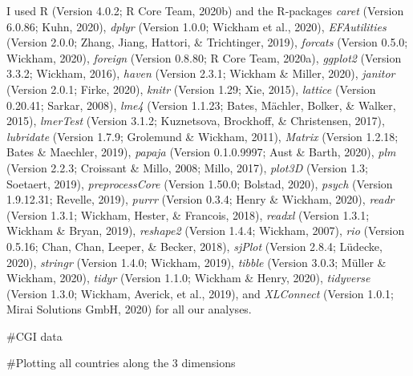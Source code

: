 \documentclass[
  english,
  man]{apa6}
\begin{document}
I used R (Version 4.0.2; R Core Team, 2020b) and the R-packages \emph{caret} (Version 6.0.86; Kuhn, 2020), \emph{dplyr} (Version 1.0.0; Wickham et al., 2020), \emph{EFAutilities} (Version 2.0.0; Zhang, Jiang, Hattori, \& Trichtinger, 2019), \emph{forcats} (Version 0.5.0; Wickham, 2020), \emph{foreign} (Version 0.8.80; R Core Team, 2020a), \emph{ggplot2} (Version 3.3.2; Wickham, 2016), \emph{haven} (Version 2.3.1; Wickham \& Miller, 2020), \emph{janitor} (Version 2.0.1; Firke, 2020), \emph{knitr} (Version 1.29; Xie, 2015), \emph{lattice} (Version 0.20.41; Sarkar, 2008), \emph{lme4} (Version 1.1.23; Bates, Mächler, Bolker, \& Walker, 2015), \emph{lmerTest} (Version 3.1.2; Kuznetsova, Brockhoff, \& Christensen, 2017), \emph{lubridate} (Version 1.7.9; Grolemund \& Wickham, 2011), \emph{Matrix} (Version 1.2.18; Bates \& Maechler, 2019), \emph{papaja} (Version 0.1.0.9997; Aust \& Barth, 2020), \emph{plm} (Version 2.2.3; Croissant \& Millo, 2008; Millo, 2017), \emph{plot3D} (Version 1.3; Soetaert, 2019), \emph{preprocessCore} (Version 1.50.0; Bolstad, 2020), \emph{psych} (Version 1.9.12.31; Revelle, 2019), \emph{purrr} (Version 0.3.4; Henry \& Wickham, 2020), \emph{readr} (Version 1.3.1; Wickham, Hester, \& Francois, 2018), \emph{readxl} (Version 1.3.1; Wickham \& Bryan, 2019), \emph{reshape2} (Version 1.4.4; Wickham, 2007), \emph{rio} (Version 0.5.16; Chan, Chan, Leeper, \& Becker, 2018), \emph{sjPlot} (Version 2.8.4; Lüdecke, 2020), \emph{stringr} (Version 1.4.0; Wickham, 2019), \emph{tibble} (Version 3.0.3; Müller \& Wickham, 2020), \emph{tidyr} (Version 1.1.0; Wickham \& Henry, 2020), \emph{tidyverse} (Version 1.3.0; Wickham, Averick, et al., 2019), and \emph{XLConnect} (Version 1.0.1; Mirai Solutions GmbH, 2020) for all our analyses.

\#CGI data

\#Plotting all countries along the 3 dimensions
\end{document}
